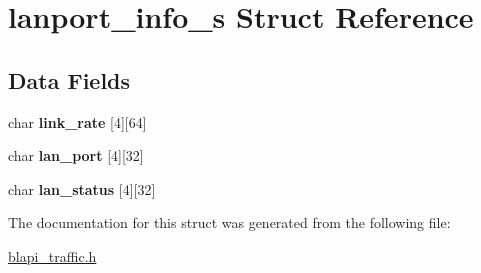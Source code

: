 \hypertarget{structlanport__info__s}{}\section{lanport\+\_\+info\+\_\+s Struct Reference}
\label{structlanport__info__s}
\subsection*{Data Fields}
\begin{DoxyCompactItemize}
\item 
\mbox{\label{structlanport__info__s_ac5d225584f37586def75a9e52a14b710}} 
char {\bfseries link\+\_\+rate} \mbox{[}4\mbox{]}\mbox{[}64\mbox{]}
\item 
\mbox{\label{structlanport__info__s_ab876472b75bc1c0db81351250e887277}} 
char {\bfseries lan\+\_\+port} \mbox{[}4\mbox{]}\mbox{[}32\mbox{]}
\item 
\mbox{\label{structlanport__info__s_aacb902351ff4ff5c99d5b912f9584311}} 
char {\bfseries lan\+\_\+status} \mbox{[}4\mbox{]}\mbox{[}32\mbox{]}
\end{DoxyCompactItemize}


The documentation for this struct was generated from the following file\+:\begin{DoxyCompactItemize}
\item 
\hyperlink{blapi__traffic_8h}{blapi\+\_\+traffic.\+h}\end{DoxyCompactItemize}
